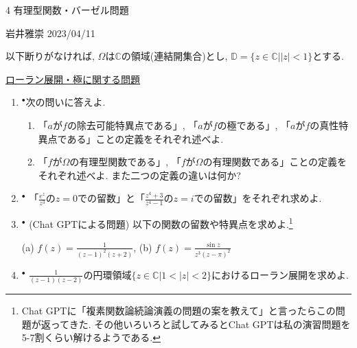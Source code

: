 \documentclass[dvipdfmx,a4paper,11pt]{article}
\newcommand{\C}{\mathbb{C}}
\newcommand{\D}{\mathbb{D}}
\theoremstyle{definition}
\begin{document}

\begin{center}
{\Large 4 有理型関数・バーゼル問題}
\end{center}

\begin{flushright}
 岩井雅崇 2023/04/11
\end{flushright}
以下断りがなければ, $\Omega$は$\C$の領域(連結開集合)とし, $\D=\{z \in \C |  |z| <1\}$とする. 

\vspace{12pt}
\hspace{-24pt}\underline{ローラン展開・極に関する問題}

\begin{enumerate}[label=\textbf{問}4.\arabic*]

\item $^{\bullet}$次の問いに答えよ. %
   \begin{enumerate}
 \setlength{\parskip}{0cm} 
  \setlength{\itemsep}{0cm} 
  \item 「$a$が$f$の除去可能特異点である」, 「$a$が$f$の極である」, 「$a$が$f$の真性特異点である」ことの定義をそれぞれ述べよ.
  \item 「$f$が$\Omega$の有理型関数である」, 「$f$が$\Omega$の有理関数である」ことの定義をそれぞれ述べよ. また二つの定義の違いは何か?　%
    \end{enumerate}
    
 
\item $^{\bullet}$ 「$\frac{e^z}{z^3}$の$z=0$での留数」と「$\frac{z^4 + 3}{z^4 -1}$の$z=i$での留数」をそれぞれ求めよ.


\item $^{\bullet}$ (Chat GPTによる問題) 以下の関数の留数や特異点を求めよ.\footnote{Chat GPTに「複素関数論続論演義の問題の案を教えて」と言ったらこの問題が返ってきた. その他いろいろと試してみるとChat GPTは私の演習問題を5-7割くらい解けるようである. }

(a) $f(z) = \frac{1}{(z-1)^2(z+2)}$,  
(b) $f(z) = \frac{\sin z}{z^3(z-\pi)^2}$

\item  $^{\bullet}$ $\frac{1}{(z-1)(z-2)}$の円環領域$\{ z\in \C | 1 < |z| < 2\}$におけるローラン展開を求めよ.


\end{enumerate}
\end{document}
